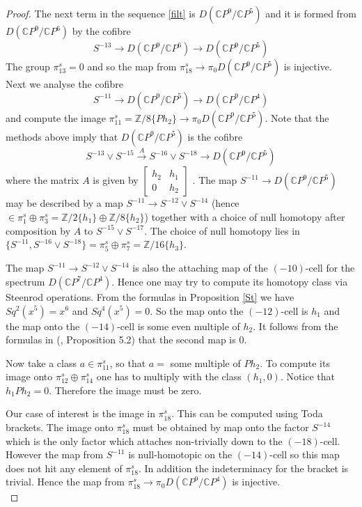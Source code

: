 \documentclass[a4paper,leqno,12pt]{amsart}
\theoremstyle{plain}
\theoremstyle{definition}
\numberwithin{equation}{section}
\begin{document}
\begin{proof}
The next term in the sequence \ref{filt} is $D({\mathbb{C}} P^9/ {\mathbb{C}} P^5)$ and it is formed from $D({\mathbb{C}} P^9/ {\mathbb{C}} P^6)$ by the cofibre
$$S^{-13} \to D({\mathbb{C}} P^9/ {\mathbb{C}} P^6) \to D({\mathbb{C}} P^9/{\mathbb{C}} P^5)  $$
The group $\pi_{13}^s = 0$ and so the map from $\pi_{18}^s \to \pi_0 D({\mathbb{C}} P^9/ {\mathbb{C}} P^5)$ is injective. \\

Next we analyse the cofibre 
$$S^{-11} \to D({\mathbb{C}} P^9/ {\mathbb{C}} P^5) \to D({\mathbb{C}} P^9/{\mathbb{C}} P^4)  $$
and compute the image $\pi_{11}^s = {\mathbb{Z}}/8\{Ph_2\} \to \pi_0 D({\mathbb{C}} P^9/ {\mathbb{C}} P^5)$. Note that the methods above imply that $D({\mathbb{C}} P^9/ {\mathbb{C}} P^5)$ is the cofibre 
\begin{equation} \label{cof5}
S^{-13}\vee S^{-15} \stackrel{A}{\to} S^{-16}\vee S^{-18} \to  D({\mathbb{C}} P^9/ {\mathbb{C}} P^5)
\end{equation}
where the matrix $A$ is given by 
$\begin{bmatrix}
    h_2 & h_1  \\
    0 & h_2
\end{bmatrix}$
. The map $S^{-11} \to D({\mathbb{C}} P^9/ {\mathbb{C}} P^5)$ may be described by a map $S^{-11} \to S^{-12} \vee S^{-14}$ (hence $\in \pi_1^s \oplus \pi_3^s ={\mathbb{Z}}/2\{h_1\}\oplus {\mathbb{Z}}/8\{h_2\}$) together with a choice of null homotopy after composition by $A$ to $S^{-15}\vee S^{-17}$. The choice of null homotopy lies in $\{S^{-11}, S^{-16}\vee S^{-18}\} = \pi_5^s\oplus \pi_7^s= {\mathbb{Z}}/16 \{h_3\}$. 

The map $S^{-11} \to S^{-12}\vee S^{-14}$ is also the attaching map of the $(-10)$-cell for the spectrum $D({\mathbb{C}} P^7/{\mathbb{C}} P^4)$. Hence one may try to compute its homotopy class via Steenrod operations. From the formulas in Proposition \ref{St}  we have $Sq^2(x^5)= x^6$ and $Sq^4(x^5)=0$. So the map onto the $(-12)$-cell is $h_1$ and the map onto the $(-14)$-cell is some even multiple of $h_2$. It follows from the formulas in (\cite{Mos68}, Proposition 5.2) that the second map is $0$. 

Now take a class $a \in \pi_{11}^s$, so that $a=$ some multiple of $Ph_2$. To compute its image onto $\pi_{12}^s \oplus \pi_{14}^s$ one has to multiply with the class $(h_1,0)$. Notice that $h_1Ph_2=0$. Therefore the image must be zero. 

Our case of interest is the image in $\pi_{18}^s$. This can be computed using Toda brackets. The image onto $\pi_{18}^s$ must be obtained by map onto the factor $S^{-14}$ which is the only factor which attaches non-trivially down to the $(-18)$-cell. However the map from $S^{-11}$ is null-homotopic on the $(-14)$-cell so this map does not hit any element of $\pi_{18}^s$. In addition the indeterminacy for the bracket is trivial. Hence the map from $\pi_{18}^s \to \pi_0 D({\mathbb{C}} P^9/ {\mathbb{C}} P^4)$ is injective. \\


\end{proof}
\end{document}
